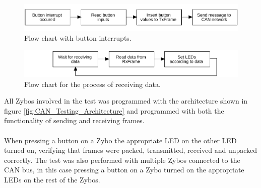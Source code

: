 \begin{figure}[h!]
	\centering
	\includegraphics[width = 1\linewidth]{graphics/FlowChart_CANSoft_BtnsIntr.pdf}
	\caption{Flow chart with button interrupts.}
	\label{fig:FlowChart_CANSoft_BtnsIntr}
\end{figure}

\begin{figure}[h!]
	\centering
	\includegraphics[width = 1\linewidth]{graphics/FlowChart_CANSoft_RecvData.pdf}
	\caption{Flow chart for the process of receiving data.}
	\label{fig:FlowChart_CANSoft_RecvData}
\end{figure}


All Zybos involved in the test was programmed with the architecture shown in figure \ref{fig:CAN_Testing_Architecture} and programmed with both the functionality of sending and receiving frames.
\\~\\
When pressing a button on a Zybo the appropriate LED on the other LED turned on, verifying that frames were packed, transmitted, received and unpacked correctly. 
The test was also performed with multiple Zybos connected to the CAN bus, in this case pressing a button on a Zybo turned on the appropriate LEDs on the rest of the Zybos.



